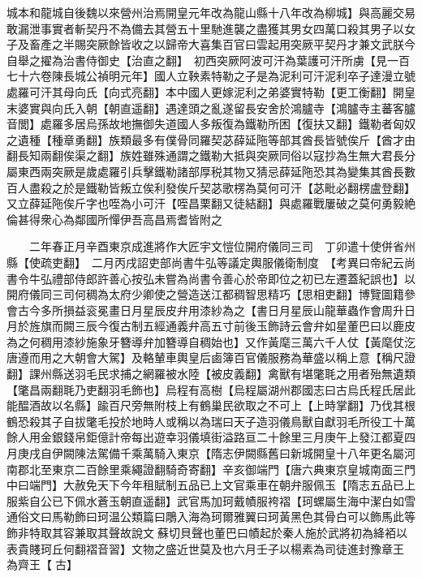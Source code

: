 城本和龍城自後魏以來營州治焉開皇元年改為龍山縣十八年改為柳城】與高麗交易敢漏泄事實者斬契丹不為備去其營五十里馳進襲之盡獲其男女四萬口殺其男子以女子及畜產之半賜突厥餘皆收之以歸帝大喜集百官曰雲起用突厥平契丹才兼文武朕今自舉之擢為治書侍御史【治直之翻】　初西突厥阿波可汗為葉護可汗所虜【見一百七十六卷陳長城公禎明元年】國人立鞅素特勒之子是為泥利可汗泥利卒子達漫立號處羅可汗其母向氏【向式亮翻】本中國人更嫁泥利之弟婆實特勒【更工衡翻】開皇末婆實與向氏入朝【朝直遥翻】遇達頭之亂遂留長安舍於鴻臚寺【鴻臚寺主蕃客臚音閭】處羅多居烏孫故地撫御失道國人多叛復為鐵勒所困【復扶又翻】鐵勒者匈奴之遺種【種章勇翻】族類最多有僕骨同羅契苾薛延陁等部其酋長皆號俟斤【酋才由翻長知兩翻俟渠之翻】族姓雖殊通謂之鐵勒大抵與突厥同俗以寇抄為生無大君長分屬東西兩突厥是歲處羅引兵擊鐵勒諸部厚税其物又猜忌薛延陁恐其為變集其酋長數百人盡殺之於是鐵勒皆叛立俟利發俟斤契苾歌楞為莫何可汗【苾毗必翻楞盧登翻】又立薛延陁俟斤字也咥為小可汗【咥昌栗翻又徒結翻】與處羅戰屢破之莫何勇毅絶倫甚得衆心為鄰國所憚伊吾高昌焉耆皆附之

　　二年春正月辛酉東京成進將作大匠宇文愷位開府儀同三司　丁卯遣十使併省州縣【使疏吏翻】　二月丙戌詔吏部尚書牛弘等議定輿服儀衛制度　【考異曰帝紀云尚書令牛弘禮部侍郎許善心按弘未嘗為尚書令善心於帝即位之初已左遷蓋紀誤也】以開府儀同三司何稠為太府少卿使之營造送江都稠智思精巧【思相吏翻】博覽圖籍參會古今多所損益衮冕畫日月星辰皮弁用漆紗為之【書日月星辰山龍華蟲作會周升日月於旌旗而闕三辰今復古制五經通義弁高五寸前後玉飾詩云會弁如星董巴曰以鹿皮為之何稠用漆紗施象牙簪導弁加簪導自稠始也】又作黃麾三萬六千人仗【黃麾仗汔唐遵而用之大朝會大駕】及輅輦車輿皇后鹵簿百官儀服務為華盛以稱上意【稱尺證翻】課州縣送羽毛民求捕之網羅被水陸【被皮義翻】禽獸有堪氅毦之用者殆無遺類【氅昌兩翻毦乃吏翻羽毛飾也】烏程有高樹【烏程屬湖州郡國志曰古烏氏程氏居此能醖酒故以名縣】踰百尺旁無附枝上有鶴巢民欲取之不可上【上時掌翻】乃伐其根鶴恐殺其子自拔氅毛投於地時人或稱以為瑞曰天子造羽儀鳥獸自獻羽毛所役工十萬餘人用金銀錢帛鉅億計帝每出遊幸羽儀填街溢路亘二十餘里三月庚午上發江都夏四月庚戌自伊闕陳法駕備千乘萬騎入東京【隋志伊闕縣舊曰新城開皇十八年更名屬河南郡北至東京二百餘里乘繩證翻騎奇寄翻】辛亥御端門【唐六典東京皇城南面三門中曰端門】大赦免天下今年租賦制五品已上文官乘車在朝弁服佩玉【隋志五品已上服紫自公已下佩水蒼玉朝直遥翻】武官馬加珂戴幘服袴褶【珂螺屬生海中潔白如雪通俗文曰馬勒飾曰珂温公類篇曰鵰入海為珂爾雅翼曰珂黃黑色其骨白可以飾馬此等飾非特取其容兼取其聲故說文蘇切貝聲也董巴曰幘起於秦人施於武將初為絳袹以表貴賤珂丘何翻褶音習】文物之盛近世莫及也六月壬子以楊素為司徒進封豫章王為齊王【古】

